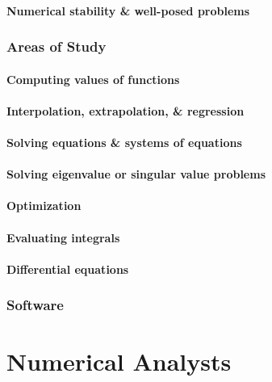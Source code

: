 \documentclass[oneside]{book}
\numberwithin{equation}{section}
\begin{document}
\subsubsection{Numerical stability \& well-posed problems}

\subsection{Areas of Study}

\subsubsection{Computing values of functions}

\subsubsection{Interpolation, extrapolation, \& regression}

\subsubsection{Solving equations \& systems of equations}

\subsubsection{Solving eigenvalue or singular value problems}

\subsubsection{Optimization}

\subsubsection{Evaluating integrals}

\subsubsection{Differential equations}

\subsection{Software}


\chapter{Numerical Analysts}
\end{document}
